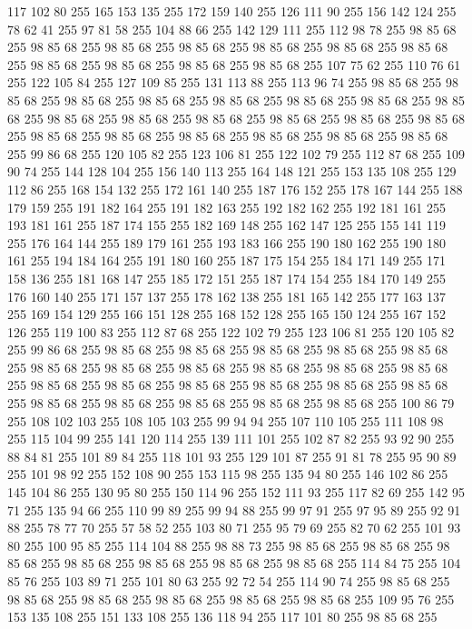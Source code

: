 117 102 80 255 165 153 135 255 172 159 140 255 126 111 90 255 156 142 124 255 78 62 41 255 97 81 58 255 104 88 66 255 142 129 111 255 112 98 78 255 98 85 68 255 98 85 68 255 98 85 68 255 98 85 68 255 98 85 68 255 98 85 68 255 98 85 68 255 98 85 68 255 98 85 68 255 98 85 68 255 98 85 68 255 107 75 62 255 110 76 61 255 122 105 84 255 127 109 85 255 131 113 88 255 113 96 74 255 98 85 68 255 98 85 68 255 98 85 68 255 98 85 68 255 98 85 68 255 98 85 68 255 98 85 68 255 98 85 68 255 98 85 68 255 98 85 68 255 98 85 68 255 98 85 68 255 98 85 68 255 98 85 68 255 98 85 68 255 98 85 68 255 98 85 68 255 98 85 68 255 98 85 68 255 98 85 68 255 99 86 68 255 120 105 82 255 123 106 81 255 122 102 79 255 112 87 68 255 109 90 74 255 144 128 104 255 156 140 113 255 164 148 121 255 153 135 108 255 129 112 86 255 168 154 132 255 172 161 140 255 187 176 152 255 178 167 144 255 188 179 159 255 191 182 164 255
191 182 163 255 192 182 162 255 192 181 161 255 193 181 161 255 187 174 155 255 182 169 148 255 162 147 125 255 155 141 119 255 176 164 144 255 189 179 161 255 193 183 166 255 190 180 162 255 190 180 161 255 194 184 164 255 191 180 160 255 187 175 154 255 184 171 149 255 171 158 136 255 181 168 147 255 185 172 151 255 187 174 154 255 184 170 149 255 176 160 140 255 171 157 137 255 178 162 138 255 181 165 142 255 177 163 137 255 169 154 129 255 166 151 128 255 168 152 128 255 165 150 124 255 167 152 126 255 119 100 83 255 112 87 68 255 122 102 79 255 123 106 81 255 120 105 82 255 99 86 68 255 98 85 68 255 98 85 68 255 98 85 68 255 98 85 68 255 98 85 68 255 98 85 68 255 98 85 68 255 98 85 68 255 98 85 68 255 98 85 68 255 98 85 68 255 98 85 68 255 98 85 68 255 98 85 68 255 98 85 68 255 98 85 68 255 98 85 68 255 98 85 68 255 98 85 68 255 98 85 68 255 98 85 68 255 98 85 68 255 100 86 79 255 108 102 103 255 108 105 103 255 99 94 94 255
107 110 105 255 111 108 98 255 115 104 99 255 141 120 114 255 139 111 101 255 102 87 82 255 93 92 90 255 88 84 81 255 101 89 84 255 118 101 93 255 129 101 87 255 91 81 78 255 95 90 89 255 101 98 92 255 152 108 90 255 153 115 98 255 135 94 80 255 146 102 86 255 145 104 86 255 130 95 80 255 150 114 96 255 152 111 93 255 117 82 69 255 142 95 71 255 135 94 66 255 110 99 89 255 99 94 88 255 99 97 91 255 97 95 89 255 92 91 88 255 78 77 70 255 57 58 52 255 103 80 71 255 95 79 69 255 82 70 62 255 101 93 80 255 100 95 85 255 114 104 88 255 98 88 73 255 98 85 68 255 98 85 68 255 98 85 68 255 98 85 68 255 98 85 68 255 98 85 68 255 98 85 68 255 114 84 75 255 104 85 76 255 103 89 71 255 101 80 63 255 92 72 54 255 114 90 74 255 98 85 68 255 98 85 68 255 98 85 68 255 98 85 68 255 98 85 68 255 98 85 68 255 109 95 76 255 153 135 108 255 151 133 108 255 136 118 94 255 117 101 80 255 98 85 68 255
